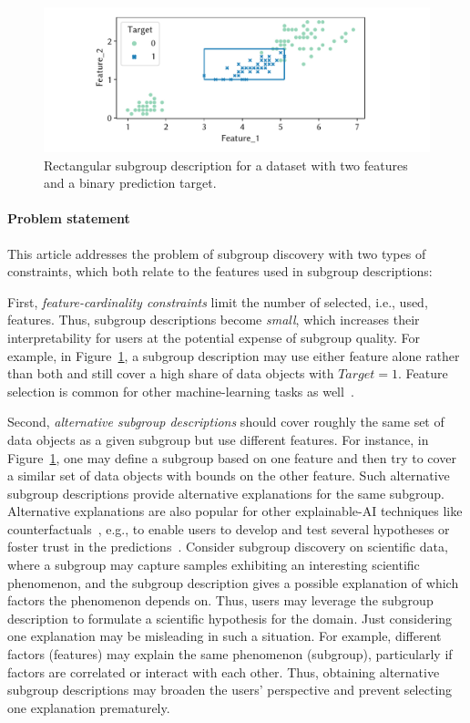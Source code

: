\documentclass[acmsmall]{acmart} %
\theoremstyle{acmplain}
\theoremstyle{acmdefinition}
\begin{document}
\begin{figure}[t]
	\centering
	\includegraphics[width=\columnwidth, trim=15 15 15 14, clip]{plots/csd-exemplary-subgroup.pdf}
	\caption{
		Rectangular subgroup description for a dataset with two features and a binary prediction target.
	}
	\label{fig:csd:exemplary-subgroup}
\end{figure}

\paragraph{Problem statement}

This article addresses the problem of subgroup discovery with two types of constraints,
which both relate to the features used in subgroup descriptions:

First, \emph{feature-cardinality constraints} limit the number of selected, i.e., used, features.
Thus, subgroup descriptions become \emph{small}, which increases their interpretability for users at the potential expense of subgroup quality.
For example, in Figure~\ref{fig:csd:exemplary-subgroup}, a subgroup description may use either feature alone rather than both and still cover a high share of data objects with $\mathit{Target} = 1$.
Feature selection is common for other machine-learning tasks as well~\cite{guyon2003introduction, li2017feature}.

Second, \emph{alternative subgroup descriptions} should cover roughly the same set of data objects as a given subgroup but use different features.
For instance, in Figure~\ref{fig:csd:exemplary-subgroup}, one may define a subgroup based on one feature and then try to cover a similar set of data objects with bounds on the other feature.
Such alternative subgroup descriptions provide alternative explanations for the same subgroup.
Alternative explanations are also popular for other explainable-AI techniques like counterfactuals~\cite{mothilal2020explaining, russell2019efficient}, e.g., to enable users to develop and test several hypotheses or foster trust in the predictions~\cite{kim2021multi, wang2019designing}.
Consider subgroup discovery on scientific data, where a subgroup may capture samples exhibiting an interesting scientific phenomenon, and the subgroup description gives a possible explanation of which factors the phenomenon depends on.
Thus, users may leverage the subgroup description to formulate a scientific hypothesis for the domain.
Just considering one explanation may be misleading in such a situation.
For example, different factors (features) may explain the same phenomenon (subgroup), particularly if factors are correlated or interact with each other.
Thus, obtaining alternative subgroup descriptions may broaden the users' perspective and prevent selecting one explanation prematurely.
\end{document}
